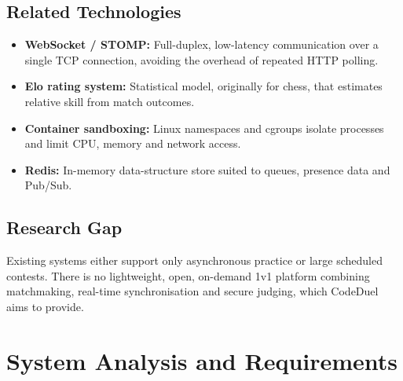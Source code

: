 \documentclass[12pt,a4paper,oneside]{report}
\begin{document}
\section{Related Technologies}
\begin{itemize}[leftmargin=*]
  \item \textbf{WebSocket / STOMP:} Full-duplex, low-latency communication over a single TCP connection,
        avoiding the overhead of repeated HTTP polling.
  \item \textbf{Elo rating system:} Statistical model, originally for chess, that estimates relative skill
        from match outcomes.
  \item \textbf{Container sandboxing:} Linux namespaces and cgroups isolate processes and limit CPU,
        memory and network access.
  \item \textbf{Redis:} In-memory data-structure store suited to queues, presence data and Pub/Sub.
\end{itemize}

\section{Research Gap}
Existing systems either support only asynchronous practice or large scheduled contests. There is no
lightweight, open, on-demand 1v1 platform combining matchmaking, real-time synchronisation and secure
judging, which CodeDuel aims to provide.

\chapter{System Analysis and Requirements}
\end{document}
